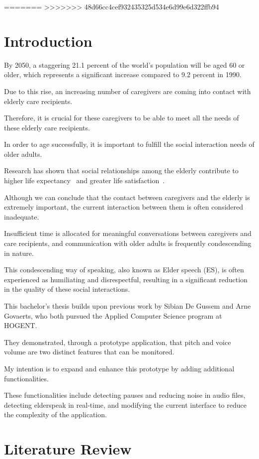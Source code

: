 \documentclass[english]{hogent-article}
\begin{document}
=======
>>>>>>> 48d66cc4cef932435325d534e6d99e6d322ffb94
\section{Introduction}%
\label{sec:Introduction}

By 2050, a staggering 21.1 percent of the world's population will be aged 60 or older, which represents a significant increase compared to 9.2 percent in 1990.

Due to this rise, an increasing number of caregivers are coming into contact with elderly care recipients.

Therefore, it is crucial for these caregivers to be able to meet all the needs of these elderly care recipients.

In order to age successfully, it is important to fulfill the social interaction needs of older adults.

Research has shown that social relationships among the elderly contribute to higher life expectancy~\autocite{Rodriguez-Laso2007} and greater life satisfaction~\autocite{Okamoto2008-eh}.

Although we can conclude that the contact between caregivers and the elderly is extremely important, the current interaction between them is often considered inadequate.

Insufficient time is allocated for meaningful conversations between caregivers and care recipients, and communication with older adults is frequently condescending in nature.

This condescending way of speaking, also known as Elder speech (ES), is often experienced as humiliating and disrespectful, resulting in a significant reduction in the quality of these social interactions.

This bachelor's thesis builds upon previous work by Sibian De Gussem and Arne Govaerts, who both pursued the Applied Computer Science program at HOGENT.

They demonstrated, through a prototype application, that pitch and voice volume are two distinct features that can be monitored.

My intention is to expand and enhance this prototype by adding additional functionalities.

These functionalities include detecting pauses and reducing noise in audio files, detecting elderspeak in real-time, and modifying the current interface to reduce the complexity of the application.

\section{Literature Review}%
\label{sec:literature review}
\end{document}
